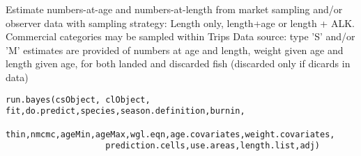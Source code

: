 \begin{Description}\relax
Estimate numbers-at-age and numbers-at-length from market sampling and/or observer data 
with sampling strategy: Length only, length+age or length + ALK. Commercial categories  may be 
sampled within Trips
Data source:  type 'S' and/or 'M'
estimates are provided of numbers at age and length, weight given age and length given age, for 
both landed and discarded fish (discarded only if dicards in data)
\end{Description}
\begin{Usage}
\begin{verbatim}
run.bayes(csObject, clObject, fit,do.predict,species,season.definition,burnin,
                    thin,nmcmc,ageMin,ageMax,wgl.eqn,age.covariates,weight.covariates,
                    prediction.cells,use.areas,length.list,adj)\end{verbatim}
\end{Usage}
